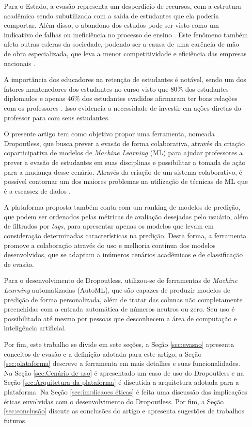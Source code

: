 \documentclass[12pt]{article}
\begin{document}
Para o Estado, a evasão representa um desperdício de recursos, com a estrutura acadêmica sendo subutilizada com a saída de estudantes que ela poderia comportar. Além disso, o abandono dos estudos pode ser visto como um indicativo de falhas ou ineficiência no processo de ensino \cite{gilioli:2016}. Este fenômeno também afeta outras esferas da sociedade, podendo ser a causa de uma carência de mão de obra especializada, que leva a menor competitividade e eficiência das empresas nacionais \cite{mussliner:2021}.

A importância dos educadores na retenção de estudantes é notável, sendo um dos fatores mantenedores dos estudantes no curso visto que 80\% dos estudantes diplomados e apenas 46\% dos estudantes evadidos afirmaram ter boas relações com os professores \cite{silva_rodrigues_brito_frança_2012}. Isso evidencia a necessidade de investir em ações diretas do professor para com seus estudantes.

O presente artigo tem como objetivo propor uma ferramenta, nomeada Dropoutless, que busca prever a evasão de forma colaborativa, através da criação coparticipativa de modelos de \textit{Machine Learning} (ML) para ajudar professores a prever a evasão de estudantes em suas disciplinas e possibilitar a tomada de ação para a mudança desse cenário. Através da criação de um sistema colaborativo, é possível contornar um dos maiores problemas na utilização de técnicas de ML que é a escassez de dados \cite{bansal:2022}.

A plataforma proposta também conta com um ranking de modelos de predição, que podem ser ordenados pelas métricas de avaliação desejadas pelo usuário, além de filtrados por \textit{tags}, para apresentar apenas os modelos que levam em consideração determinadas características na predição. Desta forma, a ferramenta promove a colaboração através do uso e melhoria contínua dos modelos desenvolvidos, que se adaptam a inúmeros cenários acadêmicos e de classificação de evasão.

Para o desenvolvimento de Dropoutless, utilizou-se de ferramentas de \textit{Machine Learning} automatizadas (AutoML), que são capazes de produzir modelos de predição de forma personalizada, além de tratar das colunas não completamente preenchidas com a entrada automática de números neutros ou zero. Seu uso é possibilitado até mesmo por pessoas que desconhecem a área de computação e inteligência artificial.

Por fim, este trabalho se divide em sete seções, a Seção \ref{sec:evasao} apresenta conceitos de evasão e a definição adotada para este artigo, a Seção \ref{sec:plataforma} descreve a ferramenta em mais detalhes e suas funcionalidades. Na Seção \ref{sec:Cenário de uso} é apresentado um caso de uso do Dropoutless e na Seção \ref{sec:Arquitetura da plataforma} é discutida a arquitetura adotada para a plataforma. Na Seção \ref{sec:implicaoes éticas} é feita uma discussão das implicações éticas envolvidas com o desenvolvimento do Dropoutless. Por fim, a Seção \ref{sec:conclusão} discute as conclusões do artigo e apresenta sugestões de trabalhos futuros.
\end{document}
